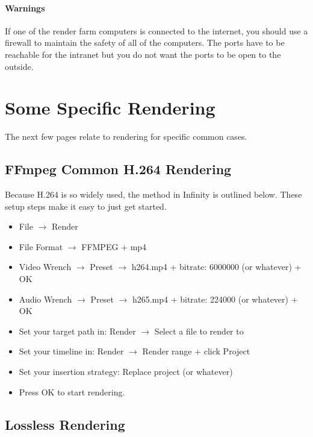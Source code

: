 \paragraph{Warnings}

If one of the render farm computers is connected to the internet, you should use a firewall to maintain the safety of all of the computers.  The ports have to be reachable for the intranet but you do not want the ports to be open to the outside.

\section{Some Specific Rendering}%
\label{sec:some_specific_rendering}

\noindent The next few pages relate to rendering for specific common cases.

\subsection{FFmpeg Common H.264 Rendering}%
\label{sub:ffmpeg_h264_rendering}

Because H.264 is so widely used, the method in \CGG{} Infinity is outlined below.  These setup steps make it easy to just get started.

\begin{itemize}
    \item File $\rightarrow$ Render
    \item File Format $\rightarrow$ FFMPEG + mp4
    \item Video Wrench $\rightarrow$ Preset $\rightarrow$ h264.mp4 + bitrate: 6000000 (or whatever) + OK
    \item Audio Wrench $\rightarrow$ Preset $\rightarrow$ h265.mp4 + bitrate: 224000 (or whatever) + OK
    \item Set your target path in: Render $\rightarrow$ Select a file to render to
    \item Set your timeline in: Render $\rightarrow$ Render range + click Project
    \item Set your insertion strategy: Replace project (or whatever)
    \item Press OK to start rendering.
\end{itemize}

\subsection{Lossless Rendering}%
\label{sub:loseeless_rendering}

